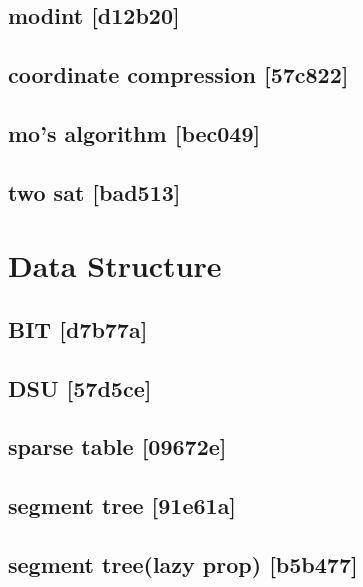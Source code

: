 \subsection{modint {\footnotesize [d12b20]} }

\subsection{coordinate compression {\footnotesize [57c822]} }

\subsection{mo's algorithm {\footnotesize [bec049]} }

\subsection{two sat {\footnotesize [bad513]} }


\section{Data Structure}
\subsection{BIT {\footnotesize [d7b77a]} }

\subsection{DSU {\footnotesize [57d5ce]} }

\subsection{sparse table {\footnotesize [09672e]} }

\subsection{segment tree {\footnotesize [91e61a]} }

\subsection{segment tree(lazy prop) {\footnotesize [b5b477]} }

